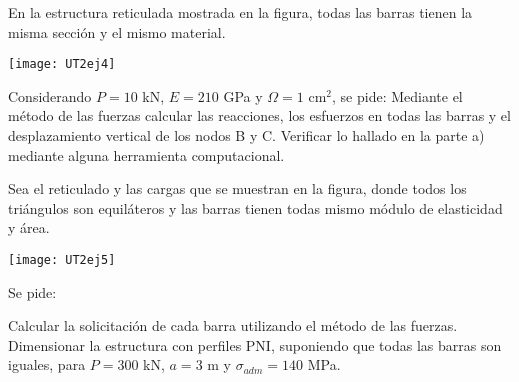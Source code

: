 \ejercicio

En la estructura reticulada mostrada en la figura, todas las barras tienen la misma sección y el mismo material.

\begin{center}
	\texttt{[image: UT2ej4]}
\end{center}

Considerando  $P=10$ kN, $E=210$ GPa y $\Omega=1$ cm$^2$, se pide:
%
\parte Mediante el método de las fuerzas calcular las reacciones, los esfuerzos en todas las barras y el desplazamiento vertical de los nodos B y C. 
%
\parte Verificar lo hallado en la parte a) mediante alguna herramienta computacional.


\ejercicio
Sea el reticulado y las cargas que se muestran en la figura, donde todos los triángulos son equiláteros y las barras tienen todas mismo módulo de elasticidad y área.

\begin{center}
	\texttt{[image: UT2ej5]}
\end{center}

Se pide:

\parte Calcular la solicitación de cada barra utilizando el método de las fuerzas.
\parte Dimensionar la estructura con perfiles PNI, suponiendo que todas las barras son iguales, para $P=300$ kN, $a=3$ m y $\sigma_{adm}=140$ MPa.

